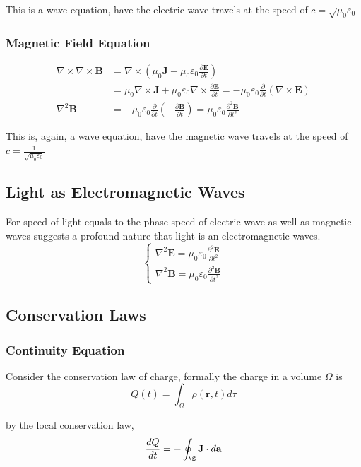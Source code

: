 \documentclass[UTF8]{book}
\begin{document}
This is a wave equation, have the electric wave travels at the speed of $c=\sqrt{\mu_0\varepsilon_0}$
\subsubsection{Magnetic Field Equation}
\begin{align*}
\nabla \times \nabla \times \mathbf{B}&=\nabla \times \left(\mu_0 \mathbf{J} + \mu_0\varepsilon_0\frac{\partial \mathbf{E}}{\partial t}\right)\\
&=\mu_0 \nabla \times \mathbf{J}+\mu_0\varepsilon_0 \nabla \times \frac{\partial \mathbf{E}}{\partial t}=-\mu_0\varepsilon_0 \frac{\partial }{\partial t}\left(\nabla \times \mathbf{E}\right)\\
\nabla ^2\mathbf{B}&=-\mu_0\varepsilon_0 \frac{\partial }{\partial t}\left(-\frac{\partial \mathbf{B}}{\partial t}\right)=\mu_0\varepsilon_0 \frac{\partial ^2\mathbf{B}}{\partial t^2}
\end{align*}

This is, again, a wave equation, have the magnetic wave travels at the speed of $c=\frac{1}{\sqrt{\mu_0\varepsilon_0 }}$


\subsection{Light as Electromagnetic Waves}
For speed of light equals to the phase speed of electric wave as well as magnetic waves suggests a profound nature that light is an electromagnetic waves. 
\[\begin{cases}
\nabla ^2\mathbf{E}=\mu_0 \varepsilon_0\frac{\partial ^2 \mathbf{E}}{\partial t^2}\\
\nabla ^2\mathbf{B}=\mu_0\varepsilon_0 \frac{\partial ^2\mathbf{B}}{\partial t^2}
\end{cases}\]


\subsection{Conservation Laws}
\subsubsection{Continuity Equation}
Consider the conservation law of charge, formally the charge in a volume $\Omega $ is 
\[Q(t)=\int _{\Omega }\rho (\mathbf{r},t)d\tau\]

by the local conservation law,
\[\frac{dQ}{dt}=-\oint _{\S}\mathbf{J}\cdot d\mathbf{a}\]
\end{document}
